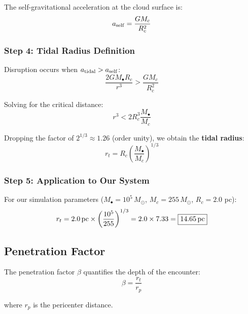 \documentclass[twocolumn,amsmath,amssymb,prd,superscriptaddress,nofootinbib]{revtex4-2}
\begin{document}
The self-gravitational acceleration at the cloud surface is:
\begin{equation}
    a_{\rm self} = \frac{GM_c}{R_c^2}
    \label{eq:a_self}
\end{equation}

\subsubsection{Step 4: Tidal Radius Definition}

Disruption occurs when $a_{\rm tidal} > a_{\rm self}$:
\begin{equation}
    \frac{2GM_\bullet R_c}{r^3} > \frac{GM_c}{R_c^2}
\end{equation}

Solving for the critical distance:
\begin{equation}
    r^3 < 2R_c^3\frac{M_\bullet}{M_c}
\end{equation}

Dropping the factor of $2^{1/3} \approx 1.26$ (order unity), we obtain the \textbf{tidal radius}:
\begin{equation}
    \boxed{r_t = R_c\left(\frac{M_\bullet}{M_c}\right)^{1/3}}
    \label{eq:r_tidal}
\end{equation}

\subsubsection{Step 5: Application to Our System}

For our simulation parameters ($M_\bullet = 10^5\,M_\odot$, $M_c = 255\,M_\odot$, $R_c = 2.0$ pc):
\begin{equation}
    r_t = 2.0\,{\rm pc} \times \left(\frac{10^5}{255}\right)^{1/3} = 2.0 \times 7.33 = \boxed{14.65\,{\rm pc}}
\end{equation}

\subsection{Penetration Factor}
\label{sec:beta}

The penetration factor $\beta$ quantifies the depth of the encounter:
\begin{equation}
    \boxed{\beta = \frac{r_t}{r_p}}
    \label{eq:beta}
\end{equation}

where $r_p$ is the pericenter distance.
\end{document}
